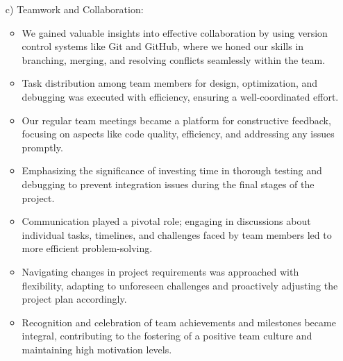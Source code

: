 \documentclass[../main.tex]{subfiles}
\begin{document}
\begin{enumerate}
    \item[c)] Teamwork and Collaboration:
    \begin{itemize}
        \item We gained valuable insights into effective collaboration by using version control systems like Git and GitHub, where we honed our skills in branching, merging, and resolving conflicts seamlessly within the team. \\
        \item Task distribution among team members for design, optimization, and debugging was executed with efficiency, ensuring a well-coordinated effort. \\
        \item Our regular team meetings became a platform for constructive feedback, focusing on aspects like code quality, efficiency, and addressing any issues promptly.\\
        \item Emphasizing the significance of investing time in thorough testing and debugging to prevent integration issues during the final stages of the project. \\
        \item Communication played a pivotal role; engaging in discussions about individual tasks, timelines, and challenges faced by team members led to more efficient problem-solving.\\
        \item Navigating changes in project requirements was approached with flexibility, adapting to unforeseen challenges and proactively adjusting the project plan accordingly. \\
        \item Recognition and celebration of team achievements and milestones became integral, contributing to the fostering of a positive team culture and maintaining high motivation levels.
    \end{itemize}
\end{enumerate}
\end{document}

